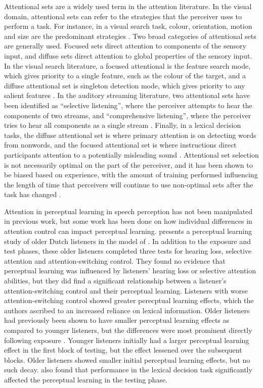 Attentional sets are a widely used term in the attention literature.  
In the visual domain, attentional sets can refer to the strategies that the perceiver uses to perform a task.  
For instance, in a visual search task, colour, orientation, motion and size are the predominant strategies \citep{Wolfe2004}.  
Two broad categories of attentional sets are generally used.  
Focused sets direct attention to components of the sensory input, and diffuse sets direct attention to global properties of the sensory input.  
In the visual search literature, a focused attentional is the feature search mode, which gives priority to a single feature, such as the colour of the target, and a diffuse attentional set is singleton detection mode, which gives priority to any salient features \citep{Bacon1994}. 
In the auditory streaming literature, two attentional sets have been identified as ``selective listening'', where the perceiver attempts to hear the components of two streams, and ``comprehensive listening'', where the perceiver tries to hear all components as a single stream  \citep{vanNoorden1975}.
Finally, in a lexical decision tasks, the diffuse attentional set is where primary attention is on detecting words from nonwords, and the focused attentional set is where instructions direct participants attention to a potentially misleading sound \citep{Pitt2012}.
Attentional set selection is not necessarily optimal on the part of the perceiver, and it has been shown to be biased based on experience, with the amount of training performed influencing the length of time that perceivers will continue to use non-optimal sets after the task has changed \citep{Leber2006}.  

Attention in perceptual learning in speech perception has not been manipulated in previous work, but some work has been done on how individual differences in attention control can impact perceptual learning.
\citet{Scharenborg2014} presents a perceptual learning study of older Dutch listeners in the model of \citet{Norris2003}.  
In addition to the exposure and test phases, these older listeners completed three tests for hearing loss, selective attention and attention-switching control.  
They found no evidence that perceptual learning was influenced by listeners' hearing loss or selective attention abilities, but they did find a significant relationship between a listener's attention-switching control and their perceptual learning.  
Listeners with worse attention-switching control showed greater perecptual learning effects, which the authors ascribed to an increased reliance on lexical information.  
Older listeners had previously been shown to have smaller perceptual learning effects as compared to younger listeners, but the differences were most prominent directly following exposure \citep{Scharenborg2013}.  
Younger listeners initially had a larger perceptual learning effect in the first block of testing, but the effect lessened over the subsequent blocks.  
Older listeners showed smaller initial perceptual learning effects, but no such decay.  
\citet{Scharenborg2013} also found that performance in the lexical decision task significantly affected the perceptual learning in the testing phase.

